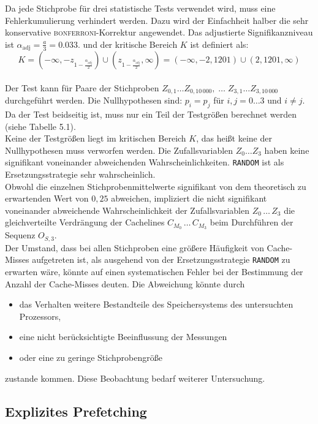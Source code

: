 \documentclass[]{scrbook}
\begin{document}
Da jede Stichprobe für drei statistische Tests verwendet wird, muss eine Feh\-ler\-ku\-mu\-lierung verhindert werden.
Dazu wird der Einfachheit halber die sehr konservative \textsc{bonferroni}-Korrektur angewendet.
Das adjustierte Signifikanzniveau ist $\alpha_{\textrm{adj}} = \frac{a}{3} = 0.033$.
und der kritische Bereich $K$ ist definiert als:
$$K = (- \infty, -z_{1-\frac{\alpha_{\textrm{adj}}}{2}}) \cup (z_{1-\frac{\alpha_{\textrm{adj}}}{2}}, \infty) = (- \infty, -2,1201) \cup (2,1201, \infty) $$
\\
Der Test kann für Paare der Stichproben $Z_{0,1} \dots Z_{0,10\,000}, \; \dots \; Z_{3,1} \dots Z_{3,10\,000}$ durchgeführt werden.
Die Nullhypothesen sind: $p_i = p_j$ für $i, j = 0 \dots 3$ und $i \ne j$.  
Da der Test beidseitig ist, muss nur ein Teil der Testgrößen berechnet werden (siehe Tabelle 5.1).
\\
Keine der Testgrößen liegt im kritischen Bereich $K$, das heißt keine der Nullhypothesen muss verworfen werden.
Die Zufallsvariablen $Z_0 \dots Z_3$ haben keine signifikant voneinander abweichenden Wahrscheinlichkeiten.
\texttt{RANDOM} ist als Ersetzungsstrategie sehr wahrscheinlich.
\\
Obwohl die einzelnen Stichprobenmittelwerte signifikant von dem theoretisch zu erwartenden Wert von $0,25$ abweichen, impliziert die nicht signifikant voneinander abweichende Wahrscheinlichkeit der Zufallsvariablen $Z_0 \, \dots \, Z_3$ die gleichverteilte Verdrängung der Cachelines $C_{M_0} \, \dots \, C_{M_3}$ beim Durchführen der Sequenz $O_{S,3}$.
\\
Der Umstand, dass bei allen Stichproben eine größere Häufigkeit von Cache-Misses aufgetreten ist, als ausgehend von der Ersetzungsstrategie \texttt{RANDOM} zu erwarten wäre, könnte auf einen systematischen Fehler bei der Bestimmung der Anzahl der Cache-Misses deuten.
Die Abweichung könnte durch
\begin{itemize}
	\item das Verhalten weitere Bestandteile des Speichersystems des untersuchten Prozessors,
	\item eine nicht berücksichtigte Beeinflussung der Messungen
	\item oder eine zu geringe Stichprobengröße 
\end{itemize}
zustande kommen.
Diese Beobachtung bedarf weiterer Untersuchung. 



\subsection{Explizites Prefetching}
\end{document}

